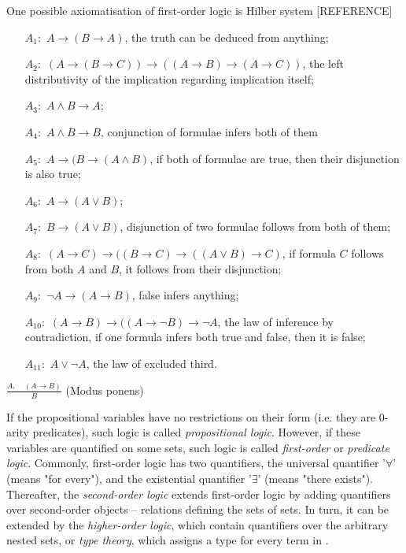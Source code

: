 \documentclass[article]{aaltoseries}
\begin{document}
One possible axiomatisation of first-order logic is Hilber system [REFERENCE]

\begin{enumerate}
\item[$A_{1}:$] ${ A\rightarrow (B\rightarrow A) }$, the truth can be deduced from anything;
\item[$A_{2}:$] ${ (A\rightarrow (B\rightarrow C))\rightarrow ((A\rightarrow B)\rightarrow (A\rightarrow C)) }$, the left distributivity of the implication regarding implication itself;
\item[$A_{3}:$] ${ A\wedge B\rightarrow A }$;
\item[$A_{4}:$] ${ A\wedge B\rightarrow B }$, conjunction of formulae infers both of them
\item[$A_{5}:$] ${ A\rightarrow (B\rightarrow (A\wedge B)}$, if both of formulae are true, then their disjunction is also true;
\item[$A_{6}:$] ${ A\rightarrow (A\vee B) }$;
\item[$A_{7}:$] ${ B\rightarrow (A\vee B) }$, disjunction of two formulae follows from both of them;
\item[$A_{8}:$] ${ (A\rightarrow C)\rightarrow ((B\rightarrow C)\rightarrow ((A\vee B)\rightarrow C) }$, if formula $C$ follows from both $A$ and $B$, it follows from their disjunction;
\item[$A_{9}:$] ${ \neg A\rightarrow (A\rightarrow B) }$, false infers anything;
\item[$A_{10}:$] ${ (A\rightarrow B)\rightarrow ((A\rightarrow \neg B)\rightarrow \neg A}$, the law of inference by contradiction, if one formula infers both true and false, then it is false;
\item[$A_{11}:$] ${ A\vee \neg A}$, the law of excluded third.
\end{enumerate}
${ {\frac {A,\quad (A\rightarrow B)}{B}}}$ (Modus ponens)

If the propositional variables have no restrictions on their form (i.e. they are 0-arity predicates), such logic is called \textit{propositional logic}. However, if these variables are quantified on some sets, such logic is called \textit{first-order} or \textit{predicate logic}. Commonly, first-order logic has two quantifiers, the universal quantifier '$\forall$' (means "for every"), and the existential quantifier '$\exists$' (means "there exists"). Thereafter, the \textit{second-order logic} extends first-order logic by adding quantifiers over second-order objects -- relations defining the sets of sets. In turn, it can be extended by the \textit{higher-order logic}, which contain quantifiers over the arbitrary nested sets, or \textit{type theory}, which assigns a type for every term in .
\end{document}
